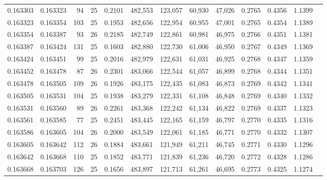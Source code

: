 \begin{tabular}{rrrrrrrrrrrrr}
0.163303 & 0.163323 &  94 &  25 &                                     0.2101 & 482,553 & 123,057 &  60,930 &  47,026 & 0.2765 & 0.4356 & 1.1399 \\
0.163323 & 0.163354 & 103 &  25 &                                     0.1953 & 482,656 & 122,954 &  60,955 &  47,001 & 0.2765 & 0.4354 & 1.1389 \\
0.163354 & 0.163387 &  93 &  26 &                                     0.2185 & 482,749 & 122,861 &  60,981 &  46,975 & 0.2766 & 0.4351 & 1.1381 \\
0.163387 & 0.163424 & 131 &  25 &                                     0.1603 & 482,880 & 122,730 &  61,006 &  46,950 & 0.2767 & 0.4349 & 1.1369 \\
0.163424 & 0.163451 &  99 &  25 &                                     0.2016 & 482,979 & 122,631 &  61,031 &  46,925 & 0.2768 & 0.4347 & 1.1359 \\
0.163452 & 0.163478 &  87 &  26 &                                     0.2301 & 483,066 & 122,544 &  61,057 &  46,899 & 0.2768 & 0.4344 & 1.1351 \\
0.163478 & 0.163505 & 109 &  26 &                                     0.1926 & 483,175 & 122,435 &  61,083 &  46,873 & 0.2769 & 0.4342 & 1.1341 \\
0.163505 & 0.163531 & 104 &  25 &                                     0.1938 & 483,279 & 122,331 &  61,108 &  46,848 & 0.2769 & 0.4340 & 1.1332 \\
0.163531 & 0.163560 &  89 &  26 &                                     0.2261 & 483,368 & 122,242 &  61,134 &  46,822 & 0.2769 & 0.4337 & 1.1323 \\
0.163561 & 0.163585 &  77 &  25 &                                     0.2451 & 483,445 & 122,165 &  61,159 &  46,797 & 0.2770 & 0.4335 & 1.1316 \\
0.163586 & 0.163605 & 104 &  26 &                                     0.2000 & 483,549 & 122,061 &  61,185 &  46,771 & 0.2770 & 0.4332 & 1.1307 \\
0.163605 & 0.163642 & 112 &  26 &                                     0.1884 & 483,661 & 121,949 &  61,211 &  46,745 & 0.2771 & 0.4330 & 1.1296 \\
0.163642 & 0.163668 & 110 &  25 &                                     0.1852 & 483,771 & 121,839 &  61,236 &  46,720 & 0.2772 & 0.4328 & 1.1286 \\
0.163668 & 0.163703 & 126 &  25 &                                     0.1656 & 483,897 & 121,713 &  61,261 &  46,695 & 0.2773 & 0.4325 & 1.1274 \\

\end{tabular}

